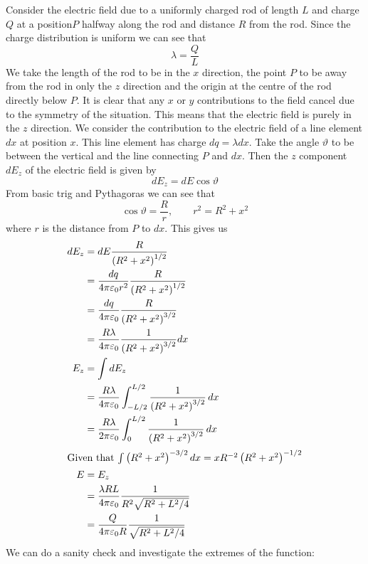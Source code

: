 \documentclass{article}
\begin{document}
    \example
    Consider the electric field due to a uniformly charged rod of length \(L\) and charge \(Q\) at a position\(P\) halfway along the rod and distance \(R\) from the rod.
    Since the charge distribution is uniform we can see that
    \[\lambda = \frac{Q}{L}\]
    We take the length of the rod to be in the \(x\) direction, the point \(P\) to be away from the rod in only the \(z\) direction and the origin at the centre of the rod directly below \(P\).
    It is clear that any \(x\) or \(y\) contributions to the field cancel due to the symmetry of the situation.
    This means that the electric field is purely in the \(z\) direction.
    We consider the contribution to the electric field of a line element \(dx\) at position \(x\).
    This line element has charge \(dq = \lambda dx\).
    Take the angle \(\vartheta\) to be between the vertical and the line connecting \(P\) and \(dx\).
    Then the \(z\) component \(dE_z\) of the electric field is given by
    \[dE_z = dE \cos\vartheta\]
    From basic trig and Pythagoras we can see that
    \[\cos\vartheta = \frac{R}{r},\qquad r^2 = R^2 + x^2\]
    where \(r\) is the distance from \(P\) to \(dx\).
    This gives us
    \begin{align*}
        dE_z &= dE\frac{R}{\left(R^2 + x^2\right)^{1/2}}\\
        &= \frac{dq}{4\pi\varepsilon_0r^2}\frac{R}{\left(R^2 + x^2\right)^{1/2}}\\
        &= \frac{dq}{4\pi\varepsilon_0}\frac{R}{\left(R^2 + x^2\right)^{3/2}}\\
        &= \frac{R\lambda}{4\pi\varepsilon_0}\frac{1}{\left(R^2 + x^2\right)^{3/2}}dx\\
        E_z &= \int dE_z\\
        &= \frac{R\lambda}{4\pi\varepsilon_0}\int_{-L/2}^{L/2}\frac{1}{\left(R^2 + x^2\right)^{3/2}}\,dx\\
        &= \frac{R\lambda}{2\pi\varepsilon_0}\int_{0}^{L/2}\frac{1}{\left(R^2 + x^2\right)^{3/2}}\,dx\\
        \intertext{Given that \(\int\left(R^2 + x^2\right)^{-3/2}dx = xR^{-2}\left(R^2 + x^2\right)^{-1/2}\)}
        E &= E_z\\
        &= \frac{\lambda RL}{4\pi\varepsilon_0}\frac{1}{R^2\sqrt{R^2 + L^2/4}}\\
        &= \frac{Q}{4\pi\varepsilon_0R}\frac{1}{\sqrt{R^2 + L^2/4}}
    \end{align*}
    We can do a sanity check and investigate the extremes of the function:
\end{document}
